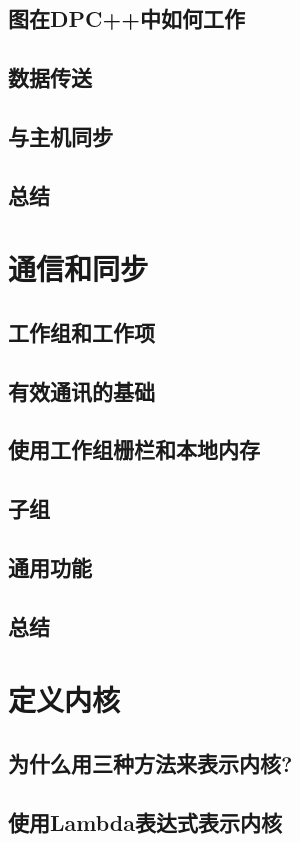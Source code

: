\documentclass[11pt,a4paper,UTF8]{ctexart}
\begin{document}
		\subsection{图在DPC++中如何工作}
		\subsection{数据传送}
		\subsection{与主机同步}
		\subsection{总结}
	\section{通信和同步}
		\subsection{工作组和工作项}
		\subsection{有效通讯的基础}
		\subsection{使用工作组栅栏和本地内存}
		\subsection{子组}
		\subsection{通用功能}
		\subsection{总结}
	\section{定义内核}
		\subsection{为什么用三种方法来表示内核?}
		\subsection{使用Lambda表达式表示内核}
\end{document}
